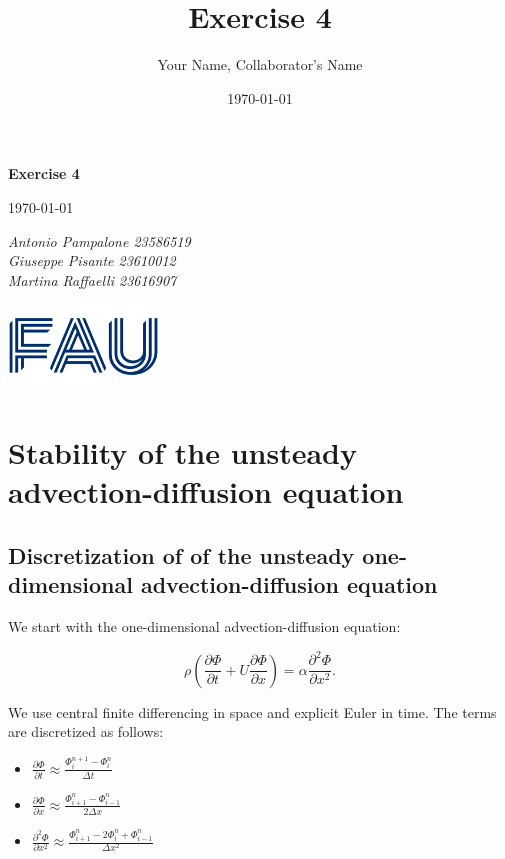 \documentclass{article}
\title{Exercise 4}
\author{Your Name, Collaborator's Name}
\date{\today}
\begin{document}
\begin{titlepage}
    \centering
    \vspace*{1in}
    
    {\Huge\bfseries Exercise 4\par}
    \vspace{1.5cm}
    {\Large \today\par}
    \vspace{1.5cm}
    {\Large\itshape Antonio Pampalone 23586519 \\ Giuseppe Pisante 23610012\\ Martina Raffaelli 23616907 \par}
    
    \vfill
    \includegraphics[width=0.3\textwidth]{FAU-Logo.png}\par\vspace{1cm} %
   
\end{titlepage}

\newpage
\small

\section{Stability of the unsteady advection-diffusion equation}

\subsection{Discretization of of the unsteady one-dimensional advection-diffusion equation}


We start with the one-dimensional advection-diffusion equation:

\[
\rho \left( \frac{\partial \Phi}{\partial t} + U \frac{\partial \Phi}{\partial x} \right) = \alpha \frac{\partial^2 \Phi}{\partial x^2}.
\]

We use central finite differencing in space and explicit Euler in time. The terms are discretized as follows:

\begin{itemize}
    \item \(\frac{\partial \Phi}{\partial t} \approx \frac{\Phi_i^{n+1} - \Phi_i^n}{\Delta t}\)
    \item \(\frac{\partial \Phi}{\partial x} \approx \frac{\Phi_{i+1}^n - \Phi_{i-1}^n}{2\Delta x}\)
    \item \(\frac{\partial^2 \Phi}{\partial x^2} \approx \frac{\Phi_{i+1}^n - 2\Phi_i^n + \Phi_{i-1}^n}{\Delta x^2}\)
\end{itemize}
\end{document}
